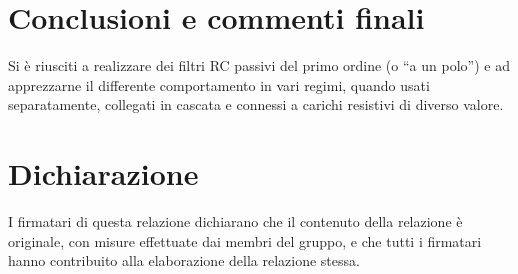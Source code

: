 \documentclass[10pt,a4paper]{article}
\begin{document}
\section*{Conclusioni e commenti finali}
Si è riusciti a realizzare dei filtri RC passivi del primo ordine
(o ``a un polo'') e ad apprezzarne il differente comportamento in vari
regimi, quando usati separatamente, collegati in cascata e connessi a
carichi resistivi di diverso valore.

\section*{Dichiarazione}
I firmatari di questa relazione dichiarano che il contenuto della relazione \`e 
originale, con misure effettuate dai membri del gruppo, e che tutti i firmatari 
hanno contribuito alla elaborazione della relazione stessa.
\end{document}
